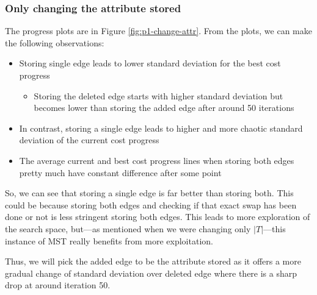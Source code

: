 \subsubsection{Only changing the attribute stored}

The progress plots are in Figure \ref{fig:p1-change-attr}. From the plots, we can make the following observations:
\begin{itemize}
    \item Storing single edge leads to lower standard deviation for the best cost progress
        \begin{itemize}
            \item Storing the deleted edge starts with higher standard deviation but becomes lower than storing the added edge after around 50 iterations
        \end{itemize}
    \item In contrast, storing a single edge leads to higher and more chaotic standard deviation of the current cost progress
    \item The average current and best cost progress lines when storing both edges pretty much have constant difference after some point
\end{itemize}

So, we can see that storing a single edge is far better than storing both. This could be because storing both edges and checking if that exact swap has been done or not is less stringent storing both edges. This leads to more exploration of the search space, but---as mentioned when we were changing only \(|T|\)---this instance of MST really benefits from more exploitation. 

Thus, we will pick the added edge to be the attribute stored as it offers a more gradual change of standard deviation over deleted edge where there is a sharp drop at around iteration 50.

